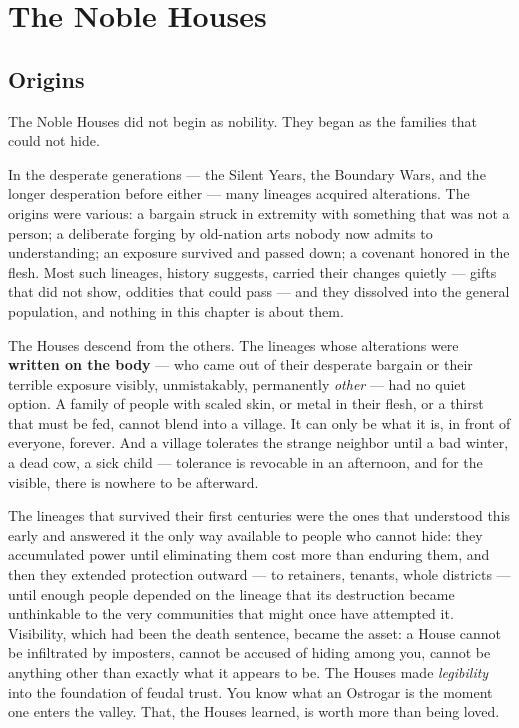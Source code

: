 \section{The Noble Houses}

\subsection{Origins}

The Noble Houses did not begin as nobility. They began as the families that could not hide.

In the desperate generations --- the Silent Years, the Boundary Wars, and the longer desperation before either --- many lineages acquired alterations. The origins were various: a bargain struck in extremity with something that was not a person; a deliberate forging by old-nation arts nobody now admits to understanding; an exposure survived and passed down; a covenant honored in the flesh. Most such lineages, history suggests, carried their changes quietly --- gifts that did not show, oddities that could pass --- and they dissolved into the general population, and nothing in this chapter is about them.

The Houses descend from the others. The lineages whose alterations were \textbf{written on the body} --- who came out of their desperate bargain or their terrible exposure visibly, unmistakably, permanently \textit{other} --- had no quiet option. A family of people with scaled skin, or metal in their flesh, or a thirst that must be fed, cannot blend into a village. It can only be what it is, in front of everyone, forever. And a village tolerates the strange neighbor until a bad winter, a dead cow, a sick child --- tolerance is revocable in an afternoon, and for the visible, there is nowhere to be afterward.

The lineages that survived their first centuries were the ones that understood this early and answered it the only way available to people who cannot hide: they accumulated power until eliminating them cost more than enduring them, and then they extended protection outward --- to retainers, tenants, whole districts --- until enough people depended on the lineage that its destruction became unthinkable to the very communities that might once have attempted it. Visibility, which had been the death sentence, became the asset: a House cannot be infiltrated by imposters, cannot be accused of hiding among you, cannot be anything other than exactly what it appears to be. The Houses made \textit{legibility} into the foundation of feudal trust. You know what an Ostrogar is the moment one enters the valley. That, the Houses learned, is worth more than being loved.


